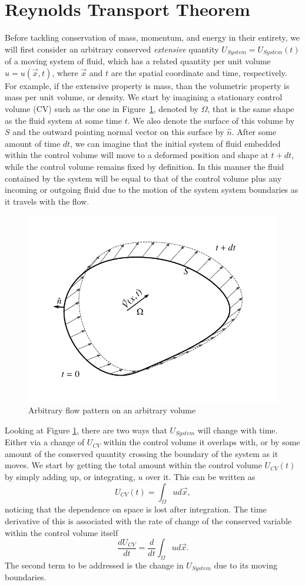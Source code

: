 \section{Reynolds Transport Theorem}
Before tackling conservation of mass, momentum, and energy in their entirety, we will first consider an arbitrary conserved {\it extensive} quantity $U_{System} = U_{System}(t)$ of a moving system of fluid, which has a related quantity per unit volume $u = u(\vec{x},t)$, where $\vec{x}$ and $t$ are the spatial coordinate and time, respectively. For example, if the extensive property is mass, than the volumetric property is mass per unit volume, or density. We start by imagining a stationary control volume (CV) such as the one in Figure~\ref{fig:reynolds_transport_volume}, denoted by $\Omega$, that is the same shape as the fluid system at some time $t$. We also denote the surface of this volume by $S$ and the outward pointing normal vector on this surface by $\hat{n}$. After some amount of time $dt$, we can imagine that the initial system of fluid embedded within the control volume will move to a deformed position and shape at $t + dt$, while the control volume remains fixed by definition. In this manner the fluid contained by the system will be equal to that of the control volume plus any incoming or outgoing fluid due to the motion of the system system boundaries as it travels with the flow.
\begin{figure}[htbp]
	\centering
	\includegraphics[width=0.5\linewidth]{Pictures/ch4_reytrans_volume}
	\caption{Arbitrary flow pattern on an arbitrary volume}
	\label{fig:reynolds_transport_volume}
\end{figure}

Looking at Figure \ref{fig:reynolds_transport_volume}, there are two ways that $U_{System}$ will change with time. Either via a change of $U_{CV}$ within the control volume it overlaps with, or by some amount of the conserved quantity crossing the boundary of the system as it moves. We start by getting the total amount within the control volume $U_{CV}(t)$ by simply adding up, or integrating, $u$ over it. This can be written as
\begin{equation}
	\label{eqn:totalcons}
	U_{CV}(t) = \int_\Omega u d\vec{x},
\end{equation}
noticing that the dependence on space is lost after integration. The time derivative of this is associated with the rate of change of the conserved variable within the control volume itself
\begin{equation}
	\label{eqn:totalcons}
	\frac{dU_{CV}}{dt} = \frac{d}{dt}\int_\Omega u d\vec{x}.
\end{equation}
The second term to be addressed is the change in $U_{System}$ due to its moving boundaries.

